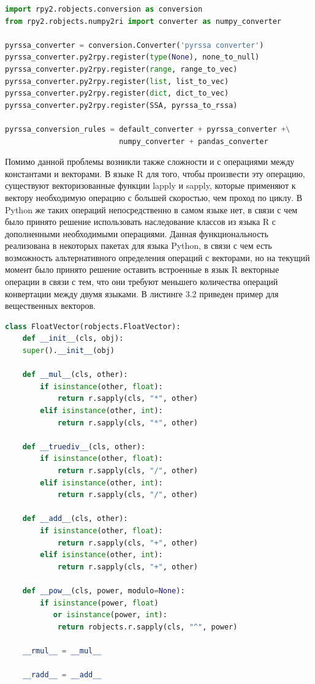 \documentclass[specialist,
			   substylefile = spbu_report.rtx,
			   subf,href,colorlinks=true, 12pt]{disser}
\begin{document}
\noindent
\begin{minipage}{\linewidth}
\begin{lstlisting}[language=Python, caption=Конвертация из Python в R.]
import rpy2.robjects.conversion as conversion
from rpy2.robjects.numpy2ri import converter as numpy_converter

pyrssa_converter = conversion.Converter('pyrssa converter')
pyrssa_converter.py2rpy.register(type(None), none_to_null)
pyrssa_converter.py2rpy.register(range, range_to_vec)
pyrssa_converter.py2rpy.register(list, list_to_vec)
pyrssa_converter.py2rpy.register(dict, dict_to_vec)
pyrssa_converter.py2rpy.register(SSA, pyrssa_to_rssa)

pyrssa_conversion_rules = default_converter + pyrssa_converter +\
                          numpy_converter + pandas_converter
\end{lstlisting}
\end{minipage}

Помимо данной проблемы возникли также сложности и с операциями между константами и векторами. В языке R для того, чтобы произвести эту операцию, существуют векторизованные функции lapply и sapply, которые применяют к вектору необходимую операцию с большей скоростью, чем проход по циклу. В Python же таких операций непосредственно в самом языке нет, в связи с чем было принято решение использовать наследование классов из языка R с дополненными необходимыми операциями. Данная функциональность реализована в некоторых пакетах \cite{habr-doc} для языка Python, в связи с чем есть возможность альтернативного определения операций с векторами, но на текущий момент было принято решение оставить встроенные в язык R векторные операции в связи с тем, что они требуют меньшего количества операций конвертации между двумя языками. В листинге 3.2 приведен пример для вещественных векторов.

\begin{lstlisting}[language=Python, caption=Наследование для FloatVector.]
class FloatVector(robjects.FloatVector):
	def __init__(cls, obj):
	super().__init__(obj)
	
	def __mul__(cls, other):
		if isinstance(other, float):
			return r.sapply(cls, "*", other)
		elif isinstance(other, int):
			return r.sapply(cls, "*", other)
	
	def __truediv__(cls, other):
		if isinstance(other, float):
			return r.sapply(cls, "/", other)
		elif isinstance(other, int):
			return r.sapply(cls, "/", other)
	
	def __add__(cls, other):
		if isinstance(other, float):
			return r.sapply(cls, "+", other)
		elif isinstance(other, int):
			return r.sapply(cls, "+", other)
	
 	def __pow__(cls, power, modulo=None):
		if isinstance(power, float) 
		   or isinstance(power, int):
			return robjects.r.sapply(cls, "^", power)
	
	__rmul__ = __mul__
	
	__radd__ = __add__	
\end{lstlisting}
\end{document}
